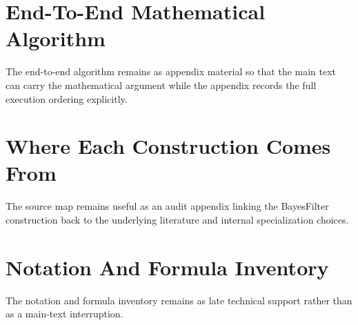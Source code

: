 \documentclass[11pt]{article}
\numberwithin{equation}{section}
\begin{document}
\section{End-To-End Mathematical Algorithm}
\label{sec:p32-end-to-end-algorithm}

The end-to-end algorithm remains as appendix material so that the main text can
carry the mathematical argument while the appendix records the full execution
ordering explicitly.

\section{Where Each Construction Comes From}
\label{sec:p32-source-map}

The source map remains useful as an audit appendix linking the BayesFilter
construction back to the underlying literature and internal specialization
choices.

\section{Notation And Formula Inventory}
\label{sec:p32-defaults}

The notation and formula inventory remains as late technical support rather than
as a main-text interruption.



\end{document}
